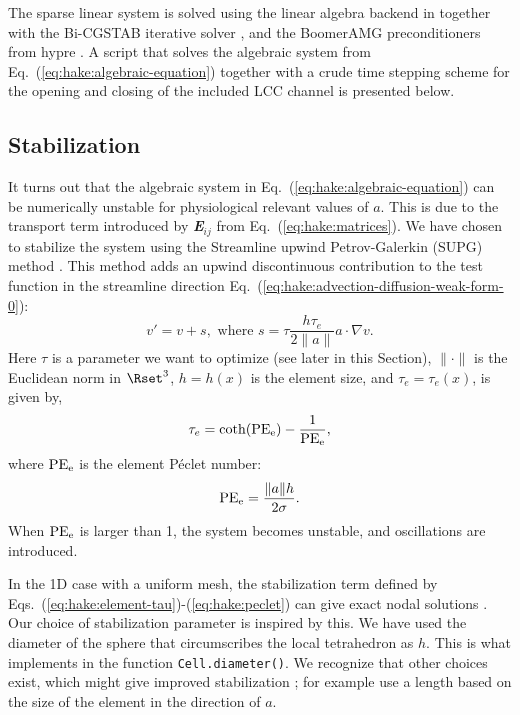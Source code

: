 The sparse linear system is solved using the \petsc linear algebra
backend \cite{BalayBuschelmanGroppEtAl2001} in \pydolfin together with
the Bi-CGSTAB iterative solver \cite{Vorst1992}, and the BoomerAMG
preconditioners from hypre \cite{FalgoutYang2002}. A script that
solves the algebraic system from
Eq.~(\ref{eq:hake:algebraic-equation}) together with a crude time
stepping scheme for the opening and closing of the included LCC
channel is presented below.\par

\subsection*{Stabilization}
\label{sec:hake:stabilization}

It turns out that the algebraic system in
Eq.~(\ref{eq:hake:algebraic-equation}) can be numerically unstable for
physiological relevant values of $a$. This is due to the transport
term introduced by {\bfseries\itshape E}$_{ij}$ from
Eq.~(\ref{eq:hake:matrices}). We have chosen to stabilize the system
using the Streamline upwind Petrov-Galerkin (SUPG) method
\cite{BrooksHughes1982}. This method adds an upwind discontinuous
contribution to the test function in the streamline direction
Eq.~(\ref{eq:hake:advection-diffusion-weak-form-0}):
\begin{equation}
  \label{eq:hake:stabilizing-term}
  v' = v+s, \text{ where } s = \tau\frac{h\tau_e}{2\|a\|}a\cdot\nabla v.
\end{equation}
Here $\tau$ is a parameter we want to optimize (see later in this
Section), $\|\cdot\|$ is the Euclidean norm in $\Rset^3$, $h=h(x)$ is
the element size, and $\tau_e=\tau_e(x)$, is given by,
\begin{equation}
  \label{eq:hake:element-tau}
  \tau_e=\coth(\mathrm{PE}_{\mathrm{e}})-\frac{1}{\mathrm{PE}_{\mathrm{e}}},
\end{equation}
where $\mathrm{PE}_{\mathrm{e}}$ is the element P\'eclet number:
\begin{equation}
  \label{eq:hake:peclet}
  \mathrm{PE}_{\mathrm{e}} = \frac{\|a\|h}{2\sigma}.
\end{equation}
When $\mathrm{PE}_{\mathrm{e}}$ is larger than 1, the system becomes unstable, and
oscillations are introduced.\par

In the 1D case with a uniform mesh, the stabilization term defined by
Eqs.~(\ref{eq:hake:element-tau})-(\ref{eq:hake:peclet}) can give exact
nodal solutions
\cite{ChristieGriffithsMitchellEtAl1976,BrooksHughes1982}. Our choice
of stabilization parameter is inspired by this. We have used the
diameter of the sphere that circumscribes the local tetrahedron as
$h$. This is what \dolfin implements in the function
\texttt{Cell.diameter()}. We recognize that other choices exist, which
might give improved stabilization \cite{JohnKnobloch2007}; for example
\citet{TezduyarPark1986} use a length based on the size of the element
in the direction of $a$.\par


